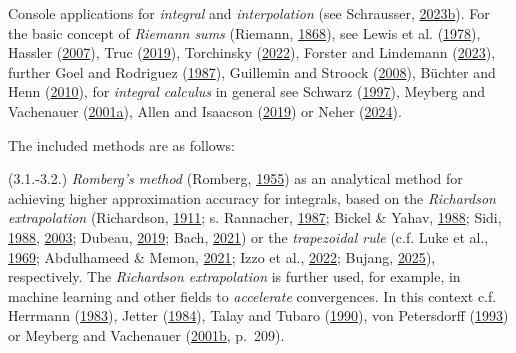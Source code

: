 \documentclass[
]{article}
\begin{document}
Console applications for \emph{integral} and \emph{interpolation} (see
Schrausser, \href{https://doi.org/10.5281/zenodo.7655056}{2023b}). For
the basic concept of \emph{Riemann sums} (Riemann,
\href{http://eudml.org/doc/135759}{1868}), see Lewis et al.
(\href{https://doi.org/10.1007/978-3-0348-5563-1_25.}{1978}), Hassler
(\href{https://doi.org/10.1007/978-3-540-73568-7_7}{2007}), Truc
(\href{https://www.jstor.org/stable/48662056}{2019}), Torchinsky
(\href{https://doi.org/10.1007/978-3-031-11799-2}{2022}), Forster and
Lindemann (\href{https://doi.org/10.1007/978-3-658-40130-6_18}{2023}),
further Goel and Rodriguez
(\href{http://www.jstor.org/stable/2689344}{1987}), Guillemin and
Stroock (\href{https://doi.org/10.1007/978-0-8176-4683-7_1}{2008}),
Büchter and Henn
(\href{https://doi.org/10.1007/978-3-8274-2680-2_6}{2010}), for
\emph{integral calculus} in general see Schwarz
(\href{https://doi.org/10.1007/978-3-663-01227-6_8}{1997}), Meyberg and
Vachenauer (\href{https://doi.org/10.1007/978-3-642-56654-7_4}{2001a}),
Allen and Isaacson
(\href{https://doi.org/10.1002/9781119245476.ch7}{2019}) or Neher
(\href{https://doi.org/10.1007/978-3-662-68815-1_7}{2024}).

The included methods are as follows:

(3.1.-3.2.) \emph{Romberg's method} (Romberg,
\href{https://www.google.com/url?sa=t\&source=web\&rct=j\&opi=89978449\&url=https://web.eng.fiu.edu/LEVY/images/EGM5346/romberg\%2520textbook\%2520example.pdf\&ved=2ahUKEwiSxr-u846SAxVFQvEDHd83Bj8QFnoECHMQAQ\&usg=AOvVaw3vtOkKCF8WeDkOB49i_03i}{1955})
as an analytical method for achieving higher approximation accuracy for
integrals, based on the \emph{Richardson extrapolation} (Richardson,
\href{https://doi.org/10.1098/rsta.1911.0009}{1911}; s. Rannacher,
\href{https://doi.org/10.1007/978-3-322-85997-6_9}{1987}; Bickel \&
Yahav, \href{http://www.jstor.org/stable/2288854}{1988}; Sidi,
\href{https://doi.org/10.1007/978-3-0348-6398-8_22}{1988},
\href{https://doi.org/10.1017/CBO9780511546815}{2003}; Dubeau,
\href{https://doi.org/10.1016/j.jcpx.2019.100017}{2019}; Bach,
\href{https://doi.org/10.1137/21M1397349}{2021}) or the
\emph{trapezoidal rule} (c.f. Luke et al.,
\href{https://doi.org/10.1016/S0076-5392(09)60075-8}{1969}; Abdulhameed
\& Memon, \href{https://doi.org/10.1088/1742-6596/2090/1/012104}{2021};
Izzo et al., \href{https://doi.org/10.1016/j.jcp.2022.111193}{2022};
Bujang, \href{https://doi.org/10.1063/5.0294833}{2025}), respectively.
The \emph{Richardson extrapolation} is further used, for example, in
machine learning and other fields to \emph{accelerate} convergences. In
this context c.f. Herrmann
(\href{https://doi.org/10.1007/978-3-322-96321-5_27}{1983}), Jetter
(\href{https://doi.org/10.1007/BF01389471}{1984}), Talay and Tubaro
(\href{https://doi.org/10.1016/0167-4730(90)90036-O}{1990}), von
Petersdorff (\href{http://www.jstor.org/stable/2324787}{1993}) or
Meyberg and Vachenauer
(\href{https://doi.org/10.1007/978-3-642-56654-7_4}{2001b}, p.~209).
\end{document}
